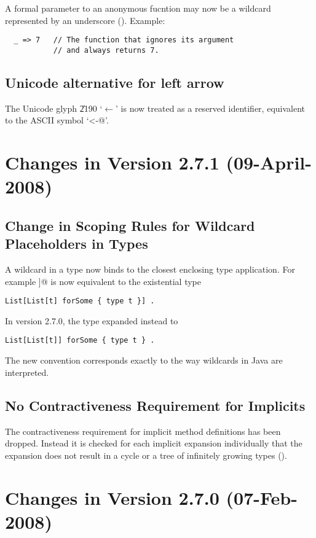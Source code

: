 A formal parameter to an anonymous fucntion 
may now be a wildcard represented by an underscore (). Example:
\begin{lstlisting}
  _ => 7   // The function that ignores its argument
           // and always returns 7.
\end{lstlisting}

\subsection*{Unicode alternative for left arrow}

The Unicode glyph \U{2190} `$\leftarrow$' is now treated as a reserved
identifier, equivalent to the ASCII symbol `\lstinline@<-@'.


\section*{Changes in Version 2.7.1 (09-April-2008)}

\subsection*{Change in Scoping Rules for Wildcard Placeholders in Types}

A wildcard in a type now binds to the closest enclosing type application.
For example \lstinline@List[List[_]]@ is now equivalent to the existential type
\begin{lstlisting}
List[List[t] forSome { type t }] . 
\end{lstlisting}
In version 2.7.0, the type expanded instead to 
\begin{lstlisting}
List[List[t]] forSome { type t } .
\end{lstlisting}
The new convention corresponds exactly to the way wildcards in Java are interpreted.

\subsection*{No Contractiveness Requirement for Implicits}

The contractiveness requirement for implicit method definitions has
been dropped. Instead it is checked for each implicit expansion
individually that the expansion does not result in a cycle or a tree
of infinitely growing types ().

\section*{Changes in Version 2.7.0 (07-Feb-2008)}

